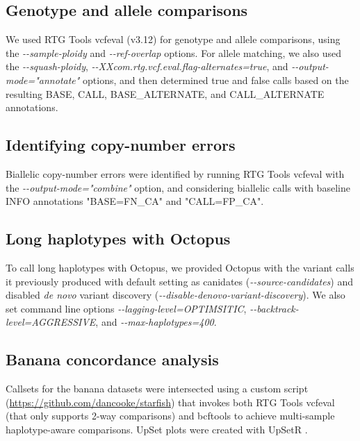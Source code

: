 \documentclass[notitlepage, twocolumn, 10pt]{article}
\begin{document}
\subsection*{Genotype and allele comparisons} We used RTG Tools vcfeval (v3.12) for genotype and allele comparisons, using the \emph{-{}-sample-ploidy} and \emph{-{}-ref-overlap} options. For allele matching, we also used the \emph{-{}-squash-ploidy}, \emph{-{-}XXcom.rtg.vcf.eval.flag-alternates=true}, and \emph{-{-}output-mode="annotate"} options, and then determined true and false calls based on the resulting BASE, CALL, BASE\_ALTERNATE, and CALL\_ALTERNATE annotations.

\subsection*{Identifying copy-number errors} Biallelic copy-number errors were identified by running RTG Tools vcfeval with the \emph{-{}-output-mode="combine"} option, and considering biallelic calls with baseline INFO annotations "BASE=FN\_CA" and "CALL=FP\_CA".

\subsection*{Long haplotypes with Octopus} 
To call long haplotypes with Octopus, we provided Octopus with the variant calls it previously produced with default setting as canidates (\emph{-{}-source-candidates}) and disabled \textit{de novo} variant discovery (\emph{-{}-disable-denovo-variant-discovery}). We also set command line options \emph{-{}-lagging-level=OPTIMSITIC}, \emph{-{}-backtrack-level=AGGRESSIVE}, and \emph{-{}-max-haplotypes=400}.


\subsection*{Banana concordance analysis} Callsets for the banana datasets were intersected using a custom script (\url{https://github.com/dancooke/starfish}) that invokes both RTG Tools vcfeval (that only supports 2-way comparisons) and bcftools to achieve multi-sample haplotype-aware comparisons. UpSet plots were created with UpSetR \cite{RN821}.
\end{document}
